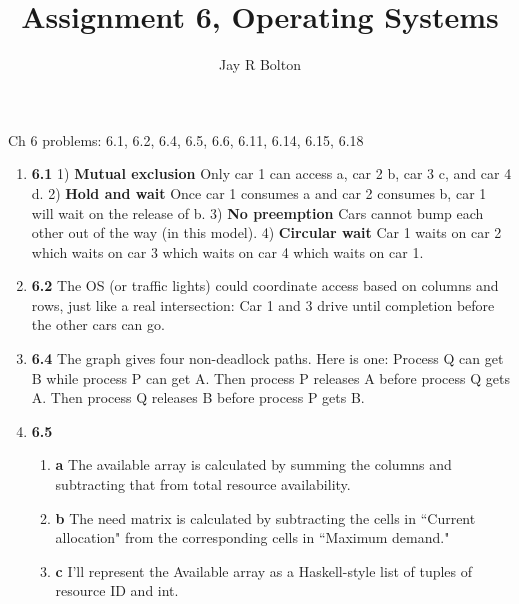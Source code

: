 \documentclass{article}
\title{Assignment 6, Operating Systems}
\author{Jay R Bolton}
\begin{document}
\maketitle

Ch 6 problems: 6.1, 6.2, 6.4, 6.5, 6.6, 6.11, 6.14, 6.15, 6.18

\begin{enumerate}
\item{\textbf{6.1}}
1) \textbf{Mutual exclusion} Only car 1 can access a, car 2 b, car 3 c, and car
4 d.  2) \textbf{Hold and wait} Once car 1 consumes a and car 2 consumes b, car
1 will wait on the release of b.  3) \textbf{No preemption} Cars cannot bump
each other out of the way (in this model).  4) \textbf{Circular wait} Car 1
waits on car 2 which waits on car 3 which waits on car 4 which waits on car 1.

\item{\textbf{6.2}}
The OS (or traffic lights) could coordinate access based on columns and rows,
just like a real intersection: Car 1 and 3 drive until completion before the
other cars can go.

\item{\textbf{6.4}}
The graph gives four non-deadlock paths. Here is one: Process Q can get B while
process P can get A. Then process P releases A before process Q gets A. Then
process Q releases B before process P gets B. 

\item{\textbf{6.5}}
\begin{enumerate}
\item{\textbf{a}}
The available array is calculated by summing the columns and subtracting that
from total resource availability.

\item{\textbf{b}}
The need matrix is calculated by subtracting the cells in ``Current allocation"
from the corresponding cells in ``Maximum demand."

\item{\textbf{c}}
I'll represent the Available array as a Haskell-style list of tuples of resource ID and int.


\end{enumerate}
\end{enumerate}
\end{document}
